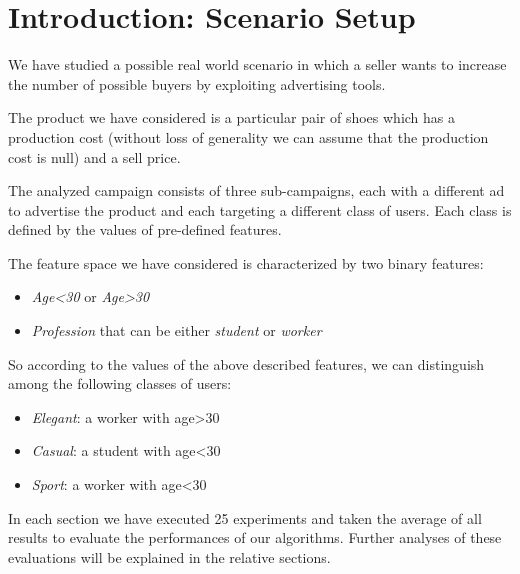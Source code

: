\chapter{Introduction: Scenario Setup}
We have studied a possible real world scenario in which a seller wants to increase the number of possible buyers by exploiting advertising tools.

The product we have considered is a particular pair of shoes which has a production cost (without loss of generality we can assume that the production cost is null) and a sell price.

The analyzed campaign consists of three sub-campaigns, each with a different ad to advertise the product and each targeting a different class of users. Each class is defined by the values of pre-defined features.

The feature space we have considered is characterized by two binary features: 
\begin{itemize}
\item \textit{Age<30} or \textit{Age>30}
\item \textit{Profession} that can be either \textit{student} or \textit{worker}
\end{itemize}

So according to the values of the above described features, we can distinguish among the following classes of users:
\begin{itemize}
\item \textit{Elegant}: a worker with age>30
\item \textit{Casual}: a student with age<30
\item \textit{Sport}: a worker with age<30
\end{itemize}

In each section we have executed 25 experiments and taken the average of all results to evaluate the performances of our algorithms.
Further analyses of these evaluations will be explained in the relative sections.
